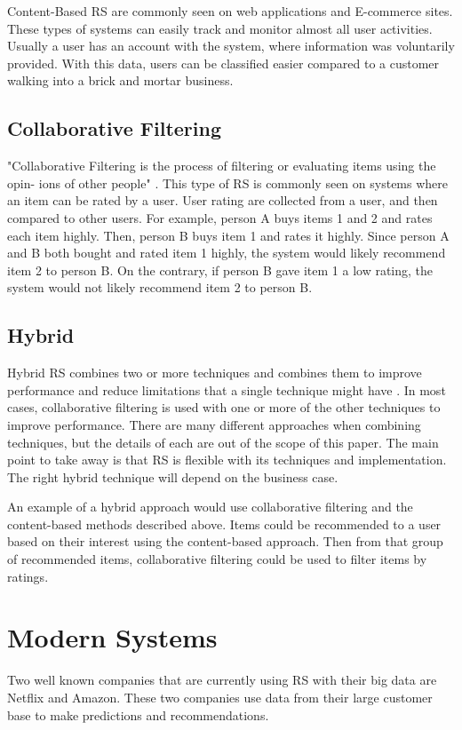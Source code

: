 \documentclass[sigconf]{acmart}
\begin{document}
Content-Based RS are commonly seen on web applications and E-commerce sites. These types of systems can easily track and monitor almost all user activities. Usually a user has an account with the system, where information was voluntarily provided. With this data, users can be classified easier compared to a customer walking into a brick and mortar business.

\subsection{Collaborative Filtering}
"Collaborative Filtering is the process of filtering or evaluating items using the opin-
ions of other people" \cite{Schafer2007}. This type of RS is commonly seen on systems where an item can be rated by a user. User rating are collected from a user, and then compared to other users. For example, person A buys items 1 and 2 and rates each item highly. Then, person B buys item 1 and rates it highly. Since person A and B both bought and rated item 1 highly, the system would likely recommend item 2 to person B. On the contrary, if person B gave item 1 a low rating, the system would not likely recommend item 2 to person B.


\subsection{Hybrid}
Hybrid RS combines two or more techniques and combines them to improve performance and reduce limitations that a single technique might have \cite{Burke2002}. In most cases, collaborative filtering is used with one or more of the other techniques to improve performance. There are many different approaches when combining techniques, but the details of each are out of the scope of this paper. The main point to take away is that RS is flexible with its techniques and implementation. The right hybrid technique will depend on the business case.

An example of a hybrid approach would use collaborative filtering and the content-based methods described above. Items could be recommended to a user based on their interest using the content-based approach. Then from that group of recommended items, collaborative filtering could be used to filter items by ratings.

\section{Modern Systems}
Two well known companies that are currently using RS with their big data are Netflix and Amazon. These two companies use data from their large customer base to make predictions and recommendations. 
\end{document}
